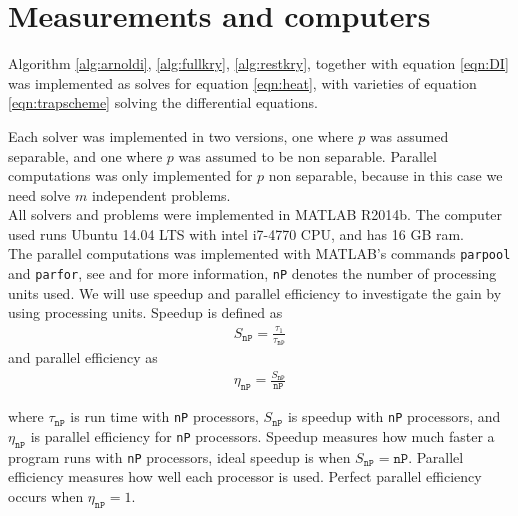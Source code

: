 \section{Measurements and computers} \label{sec:not}
Algorithm \ref{alg:arnoldi}, \ref{alg:fullkry}, \ref{alg:restkry}, together with equation \ref{eqn:DI} was implemented as solves for equation \ref{eqn:heat}, with varieties of equation \ref{eqn:trapscheme} solving the differential equations. 

Each solver was implemented in two versions, one where $p$ was assumed separable, and one where $p$ was assumed to be non separable. Parallel computations was only implemented for $p$ non separable, because in this case we need solve $m$ independent problems.\\%

All solvers and problems were implemented in MATLAB R2014b. The computer used runs Ubuntu 14.04 LTS with intel  i7-4770 CPU, and has 16 GB ram. \\

The parallel computations was implemented with MATLAB's commands \texttt{parpool} and \texttt{parfor}, see \cite{parpool} and \cite{parfor} for more information, \texttt{nP} denotes the number of processing units used. We will use speedup and parallel efficiency to investigate the gain by using processing units. Speedup is defined as
\begin{align*}
S_\texttt{nP} = \frac{\tau_1}{\tau_\texttt{nP}}
\end{align*}
and parallel efficiency as
\begin{align*}
\eta_\texttt{nP} = \frac{S_\texttt{nP}}{\texttt{nP}}
\end{align*}

where $\tau_\texttt{nP}$ is run time with \texttt{nP} processors, $S_\texttt{nP}$ is speedup with \texttt{nP} processors, and $\eta_\texttt{nP}$ is parallel efficiency for \texttt{nP} processors. Speedup measures how much faster a program runs with \texttt{nP} processors, ideal speedup is when $S_\texttt{nP} = \texttt{nP}$. Parallel efficiency measures how well each processor is used. Perfect parallel efficiency occurs when $\eta_\texttt{nP} = 1$.\\

